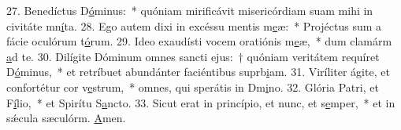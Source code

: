 27. Benedíctus D\uline{ó}minus:~* quóniam mirificávit misericórdiam suam mihi in civitáte mn\uline{í}ta.
28. Ego autem dixi in excéssu mentis m\uline{e}æ:~* Projéctus sum a fácie oculórum t\uline{ó}rum.
29. Ideo exaudísti vocem oratiónis m\uline{e}æ,~* dum clamárm \uline{a}d te.
30. Dilígite Dóminum omnes sancti ejus:~† quóniam veritátem requíret D\uline{ó}minus,~* et retríbuet abundánter faciéntibus suprb\uline{i}am.
31. Viríliter ágite, et confortétur cor v\uline{e}strum,~* omnes, qui sperátis in Dm\uline{i}no.
32. Glória Patri, et F\uline{í}lio,~* et Spirítu S\uline{a}ncto.
33. Sicut erat in princípio, et nunc, et s\uline{e}mper,~* et in sǽcula sæculórm. \uline{A}men.
